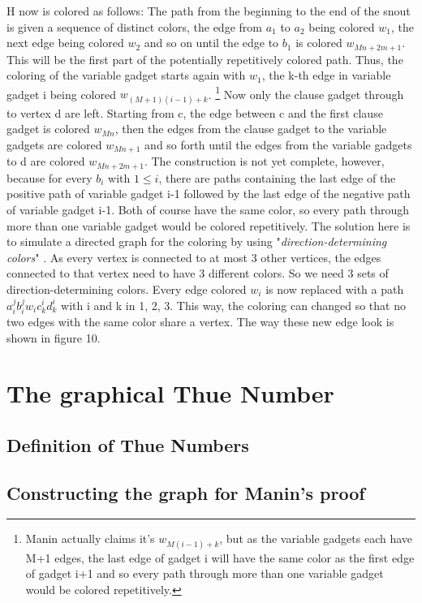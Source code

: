 \documentclass[12pt,a4paper]{article}
\begin{document}
H now is colored as follows: The path from the beginning to the end of the snout is given a sequence of distinct colors, the edge from $a_1$ to $a_2$ being colored $w_1$, the next edge being colored $w_2$ and so on until the edge to $b_1$ is colored $w_{Mn+2m+1}$. This will be the first part of the potentially repetitively colored path. Thus, the coloring of the variable gadget starts again with $w_1$, the k-th edge in variable gadget i being colored $w_{(M+1)(i-1)+k}$. \footnote{Manin actually claims it's $w_{M(i-1)+k}$, but as the variable gadgets each have M+1 edges, the last edge of gadget i will have the same color as the first edge of gadget i+1 and so every path through more than one variable gadget would be colored repetitively.} Now only the clause gadget through to vertex d are left. Starting from c, the edge between c and the first clause gadget is colored $w_{Mn}$, then the edges from the clause gadget to the variable gadgets are colored $w_{Mn+1}$ and so forth until the edges from the variable gadgets to d are colored $w_{Mn+2m+1}$. The construction is not yet complete, however, because for every $b_i$ with $1 \leq i$, there are paths containing the last edge of the positive path of variable gadget i-1 followed by the last edge of the negative path of variable gadget i-1. Both of course have the same color, so every path through more than one variable gadget would be colored repetitively. The solution here is to simulate a directed graph for the coloring by using "\textit{direction-determining colors}" \citep[p. 6]{Manin2008}. As every vertex is connected to at most 3 other vertices, the edges connected to that vertex need to have 3 different colors. So we need 3 sets of direction-determining colors. Every edge colored $w_i$ is now replaced with a path $a^j_ib^j_iw_ic^i_kd^i_k$ with i and k in {1, 2, 3}. This way, the coloring can changed so that no two edges with the same color share a vertex. The way these new edge look is shown in figure 10.
\newline


\newpage

\section{The graphical Thue Number}
\subsection{Definition of Thue Numbers}
\subsection{Constructing the graph for Manin's proof}
\end{document}
